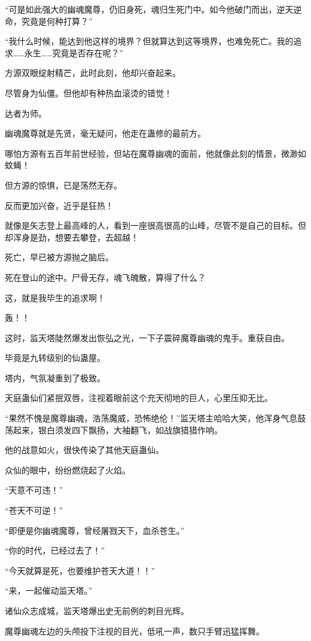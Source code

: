 \begin{this_body}
“可是如此强大的幽魂魔尊，仍旧身死，魂归生死门中。如今他破门而出，逆天逆命，究竟是何种打算？”

“我什么时候，能达到他这样的境界？但就算达到这等境界，也难免死亡。我的追求……永生……究竟是否存在呢？”

方源双眼绽射精芒，此时此刻，他却兴奋起来。

尽管身为仙僵。但他却有种热血滚烫的错觉！

达者为师。

幽魂魔尊就是先贤，毫无疑问，他走在蛊修的最前方。

哪怕方源有五百年前世经验，但站在魔尊幽魂的面前，他就像此刻的情景，微渺如蚊蝇！

但方源的惊惧，已是荡然无存。

反而更加兴奋，近乎是狂热！

就像是矢志登上最高峰的人，看到一座很高很高的山峰，尽管不是自己的目标。但却浑身是劲，想要去攀登，去超越！

死亡，早已被方源抛之脑后。

死在登山的途中。尸骨无存，魂飞魄散，算得了什么？

这，就是我毕生的追求啊！

轰！！

这时，监天塔陡然爆发出恢弘之光，一下子震碎魔尊幽魂的鬼手。重获自由。

毕竟是九转级别的仙蛊屋。

塔内，气氛凝重到了极致。

天庭蛊仙们紧抿双唇，注视着眼前这个充天彻地的巨人，心里压抑无比。

“果然不愧是魔尊幽魂，浩荡魔威，恐怖绝伦！”监天塔主哈哈大笑，他浑身气息鼓荡起来，银白须发四下飘扬，大袖翻飞，如战旗猎猎作响。

他的战意如火，很快传染了其他天庭蛊仙。

众仙的眼中，纷纷燃烧起了火焰。

“天意不可违！”

“苍天不可逆！”

“即便是你幽魂魔尊，曾经屠戮天下，血杀苍生。”

“你的时代，已经过去了！”

“今天就算是死，也要维护苍天大道！！”

“来，一起催动监天塔。”

诸仙众志成城，监天塔爆出史无前例的刺目光辉。

魔尊幽魂左边的头颅投下注视的目光，低吼一声，数只手臂迅猛挥舞。


\end{this_body}
